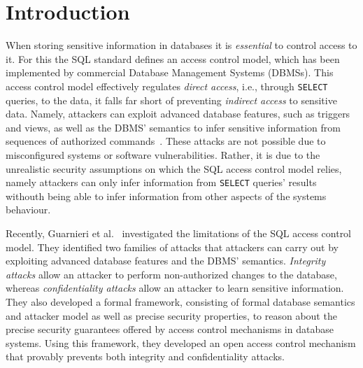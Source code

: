 \section{Introduction}
When storing sensitive information in databases it is \emph{essential} to control access to it. 
%
For this the SQL standard defines an access control model, which has been implemented by commercial Database Management Systems (DBMSs). 
%
This access control model effectively regulates \emph{direct access}, i.e., through \texttt{SELECT} queries, to the data, it falls far short of preventing \emph{indirect access} to sensitive data.
%
Namely, attackers can exploit advanced database features, such as triggers and views, as well as the DBMS' semantics to infer sensitive information from sequences of authorized commands~\cite{guarnieri2016strong, ..., ..., ...}.
%
These attacks are not possible due to misconfigured systems or software vulnerabilities. Rather, it is due to the unrealistic security assumptions on which the SQL access control model relies, namely attackers can only infer information from \texttt{SELECT} queries' results withouth being able to infer information from other aspects of the systems behaviour.

Recently, Guarnieri et al.~\cite{guarnieri2016strong} investigated the limitations of the SQL access control model. They identified two families of attacks that attackers can carry out by exploiting advanced database features and the DBMS' semantics.
%
\emph{Integrity attacks} allow an attacker to perform non-authorized changes to the database, whereas \emph{confidentiality attacks} allow an attacker to learn sensitive information.
%
They also developed a formal framework, consisting of formal database semantics and attacker model as well as precise security properties, to reason about the precise security guarantees offered by access control mechanisms in database systems.
%
Using this framework, they developed an open access control mechanism that provably prevents both integrity and confidentiality attacks.



